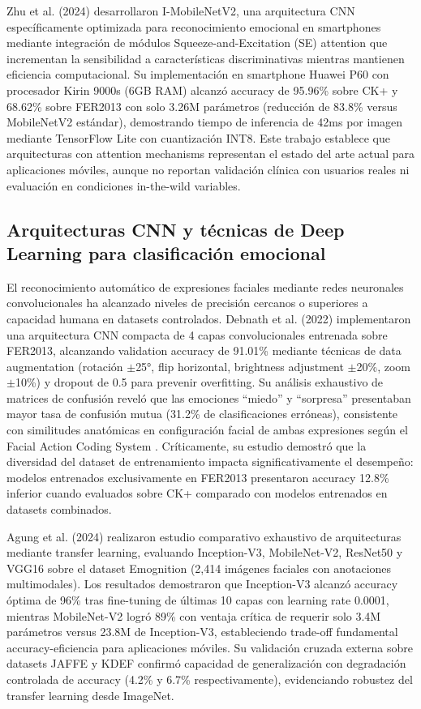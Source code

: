 \documentclass[journal,article,submit,pdftex,moreauthors]{Definitions/mdpi}
\begin{document}
	Zhu et al. (2024) \cite{ref3} desarrollaron I-MobileNetV2, una arquitectura CNN específicamente optimizada para reconocimiento emocional en smartphones mediante integración de módulos Squeeze-and-Excitation (SE) attention que incrementan la sensibilidad a características discriminativas mientras mantienen eficiencia computacional. Su implementación en smartphone Huawei P60 con procesador Kirin 9000s (6GB RAM) alcanzó accuracy de 95.96\% sobre CK+ y 68.62\% sobre FER2013 con solo 3.26M parámetros (reducción de 83.8\% versus MobileNetV2 estándar), demostrando tiempo de inferencia de 42ms por imagen mediante TensorFlow Lite con cuantización INT8. Este trabajo establece que arquitecturas con attention mechanisms representan el estado del arte actual para aplicaciones móviles, aunque no reportan validación clínica con usuarios reales ni evaluación en condiciones in-the-wild variables.
	
	\subsection{Arquitecturas CNN y técnicas de Deep Learning para clasificación emocional}
	
	El reconocimiento automático de expresiones faciales mediante redes neuronales convolucionales ha alcanzado niveles de precisión cercanos o superiores a capacidad humana en datasets controlados. Debnath et al. (2022) \cite{ref9} implementaron una arquitectura CNN compacta de 4 capas convolucionales entrenada sobre FER2013, alcanzando validation accuracy de 91.01\% mediante técnicas de data augmentation (rotación $\pm$25°, flip horizontal, brightness adjustment $\pm$20\%, zoom $\pm$10\%) y dropout de 0.5 para prevenir overfitting. Su análisis exhaustivo de matrices de confusión reveló que las emociones ``miedo'' y ``sorpresa'' presentaban mayor tasa de confusión mutua (31.2\% de clasificaciones erróneas), consistente con similitudes anatómicas en configuración facial de ambas expresiones según el Facial Action Coding System \cite{ref33,ref11,ref12}. Críticamente, su estudio demostró que la diversidad del dataset de entrenamiento impacta significativamente el desempeño: modelos entrenados exclusivamente en FER2013 presentaron accuracy 12.8\% inferior cuando evaluados sobre CK+ comparado con modelos entrenados en datasets combinados.
	
	Agung et al. (2024) \cite{ref7} realizaron estudio comparativo exhaustivo de arquitecturas mediante transfer learning, evaluando Inception-V3, MobileNet-V2, ResNet50 y VGG16 sobre el dataset Emognition (2,414 imágenes faciales con anotaciones multimodales). Los resultados demostraron que Inception-V3 alcanzó accuracy óptima de 96\% tras fine-tuning de últimas 10 capas con learning rate 0.0001, mientras MobileNet-V2 logró 89\% con ventaja crítica de requerir solo 3.4M parámetros versus 23.8M de Inception-V3, estableciendo trade-off fundamental accuracy-eficiencia para aplicaciones móviles. Su validación cruzada externa sobre datasets JAFFE y KDEF confirmó capacidad de generalización con degradación controlada de accuracy (4.2\% y 6.7\% respectivamente), evidenciando robustez del transfer learning desde ImageNet.
	
\end{document}
